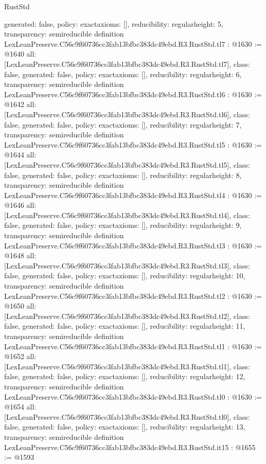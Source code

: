 \begin{lexlean}{RustStd}
\begin{coremodule}
{  generated: false,
  policy: exact{axioms: []},
  reducibility: regular{height: 5},
  transparency: semireducible
}
definition LexLeanPreserve.C56c9f60736cc3fab13bfbc383dc49ebd.R3.RustStd.tl7 : @1630 := @1640 {
  all: [LexLeanPreserve.C56c9f60736cc3fab13bfbc383dc49ebd.R3.RustStd.tl7],
  class: false,
  generated: false,
  policy: exact{axioms: []},
  reducibility: regular{height: 6},
  transparency: semireducible
}
definition LexLeanPreserve.C56c9f60736cc3fab13bfbc383dc49ebd.R3.RustStd.tl6 : @1630 := @1642 {
  all: [LexLeanPreserve.C56c9f60736cc3fab13bfbc383dc49ebd.R3.RustStd.tl6],
  class: false,
  generated: false,
  policy: exact{axioms: []},
  reducibility: regular{height: 7},
  transparency: semireducible
}
definition LexLeanPreserve.C56c9f60736cc3fab13bfbc383dc49ebd.R3.RustStd.tl5 : @1630 := @1644 {
  all: [LexLeanPreserve.C56c9f60736cc3fab13bfbc383dc49ebd.R3.RustStd.tl5],
  class: false,
  generated: false,
  policy: exact{axioms: []},
  reducibility: regular{height: 8},
  transparency: semireducible
}
definition LexLeanPreserve.C56c9f60736cc3fab13bfbc383dc49ebd.R3.RustStd.tl4 : @1630 := @1646 {
  all: [LexLeanPreserve.C56c9f60736cc3fab13bfbc383dc49ebd.R3.RustStd.tl4],
  class: false,
  generated: false,
  policy: exact{axioms: []},
  reducibility: regular{height: 9},
  transparency: semireducible
}
definition LexLeanPreserve.C56c9f60736cc3fab13bfbc383dc49ebd.R3.RustStd.tl3 : @1630 := @1648 {
  all: [LexLeanPreserve.C56c9f60736cc3fab13bfbc383dc49ebd.R3.RustStd.tl3],
  class: false,
  generated: false,
  policy: exact{axioms: []},
  reducibility: regular{height: 10},
  transparency: semireducible
}
definition LexLeanPreserve.C56c9f60736cc3fab13bfbc383dc49ebd.R3.RustStd.tl2 : @1630 := @1650 {
  all: [LexLeanPreserve.C56c9f60736cc3fab13bfbc383dc49ebd.R3.RustStd.tl2],
  class: false,
  generated: false,
  policy: exact{axioms: []},
  reducibility: regular{height: 11},
  transparency: semireducible
}
definition LexLeanPreserve.C56c9f60736cc3fab13bfbc383dc49ebd.R3.RustStd.tl1 : @1630 := @1652 {
  all: [LexLeanPreserve.C56c9f60736cc3fab13bfbc383dc49ebd.R3.RustStd.tl1],
  class: false,
  generated: false,
  policy: exact{axioms: []},
  reducibility: regular{height: 12},
  transparency: semireducible
}
definition LexLeanPreserve.C56c9f60736cc3fab13bfbc383dc49ebd.R3.RustStd.tl0 : @1630 := @1654 {
  all: [LexLeanPreserve.C56c9f60736cc3fab13bfbc383dc49ebd.R3.RustStd.tl0],
  class: false,
  generated: false,
  policy: exact{axioms: []},
  reducibility: regular{height: 13},
  transparency: semireducible
}
definition LexLeanPreserve.C56c9f60736cc3fab13bfbc383dc49ebd.R3.RustStd.it15 : @1655 := @1593 {
}
\end{coremodule}
\end{lexlean}
